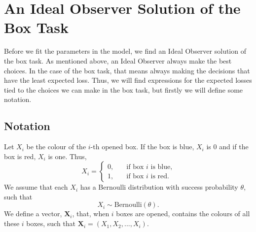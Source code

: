 
\chapter[An Ideal Observer Solution of the Box Task]{An Ideal Observer Solution of the Box Task}
Before we fit the parameters in the model, we find an Ideal Observer solution of the box task. As mentioned above, an Ideal Observer always make the best choices. In the case of the box task, that means always making the decisions that have the least expected loss. Thus, we will find expressions for the expected losses tied to the choices we can make in the box task, but firstly we will define some notation. 

\section{Notation}
Let $X_i$ be the colour of the $i$-th opened box. If the box is blue, $X_i$ is 0 and if the box is red, $X_i$ is one. Thus,
\begin{equation*}
    X_i = \begin{cases}
    0,& \quad \text{if box } i \text{ is blue,}\\
    1,& \quad \text{if box } i \text{ is red.}
    \end{cases}
\end{equation*}
We assume that each $X_i$ has a Bernoulli distribution with success probability $\theta$, such that
\begin{equation*}
    X_i \sim \text{Bernoulli}(\theta).
\end{equation*}
We define a vector, $\textbf{X}_i$, that, when $i$ boxes are opened,
contains the colours of all these $i$ boxes, such that $\textbf{X}_i = (X_1,X_2,...,X_{i})$. 

